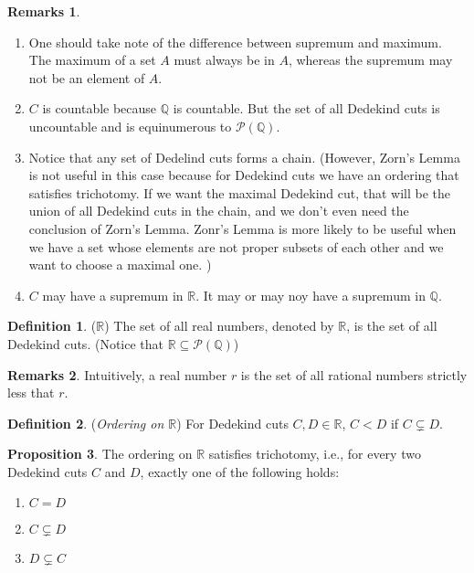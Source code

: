 \documentclass[14pt]{article}
\theoremstyle{definition}
\newtheorem*{remark}{Remarks}
\newtheorem{definition}{Definition}[subsection]
\newtheorem{proposition}[definition]{Proposition}
\newcommand{\bb}[1]{\mathbb{#1}}
\begin{document}
\begin{remark}\hfill
    \begin{enumerate}
        \item One should take note of the difference between supremum and maximum. The maximum of 
        a set $A$ must always be in $A$, whereas the supremum may not be an element of $A$.
        \item  $C$ is countable because $\bb{Q}$ is countable. But the set of all Dedekind cuts
        is uncountable and is equinumerous to $\mathcal{P}(\bb{Q})$.
        \item  Notice that any set of Dedelind cuts forms a chain. (However, Zorn's Lemma is not 
        useful in this case because for Dedekind cuts we have an ordering that satisfies trichotomy.
        If we want the maximal Dedekind cut, that will be the union of all Dedekind cuts in the
        chain, and we don't even need the conclusion of Zorn's Lemma.
        Zonr's Lemma is more likely to be useful  when we have a set whose elements are not proper
        subsets of each other and we want to choose a maximal one. )
        \item  $C$ may have a supremum in $\bb{R}$. It may or may noy have a supremum
        in  $\bb{Q}$. 
    \end{enumerate}
   
\end{remark}
\vspace{3mm}

\begin{definition}
    (\textit{$\bb{R}$}) The set of all real numbers, denoted by $\bb{R}$, 
    is the set of all Dedekind cuts. (Notice that $\bb{R}\subseteq \mathcal{P}(\bb{Q})$)
\end{definition}
\begin{remark}
    Intuitively, a real number $r$ is the set of all rational numbers strictly less that $r$.
\end{remark}

\vspace{3mm}

\begin{definition}
    (\textit{Ordering on $\bb{R}$}) For Dedekind cuts $C,D\in \bb{R}$,  $C<D$ if $C\subsetneq D$.
\end{definition}

\vspace{3mm}

\begin{proposition}
    The ordering on $\bb{R}$ satisfies trichotomy, i.e., for every two Dedekind cuts $C$ 
    and $D$, exactly one of the following holds:
    \begin{multicols}{3}
        \begin{enumerate}
            \item $C=D$
            \item $C\subsetneq D$
            \item $D\subsetneq C$
        \end{enumerate}
    \end{multicols}
\end{proposition}
\end{document}

